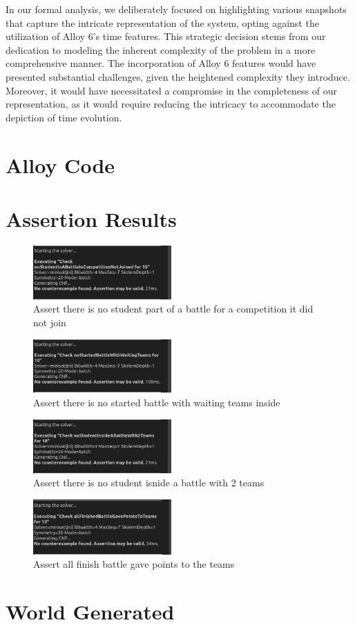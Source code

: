 In our formal analysis, we deliberately focused on highlighting various snapshots that capture the intricate representation of the system, opting against the utilization of Alloy 6's time features. This strategic decision stems from our dedication to modeling the inherent complexity of the problem in a more comprehensive manner. The incorporation of Alloy 6 features would have presented substantial challenges, given the heightened complexity they introduce. Moreover, it would have necessitated a compromise in the completeness of our representation, as it would require reducing the intricacy to accommodate the depiction of time evolution.

\section{Alloy Code}


\section{Assertion Results}

\begin{figure}[H]
    \centering
    \includegraphics[width=200px]{Images/alloy/assert_1.png}
    \caption{Assert there is no student part of a battle for a competition it did not join}
\end{figure}

\begin{figure}[H]
    \centering
    \includegraphics[width=200px]{Images/alloy/assert_2.png}
    \caption{Assert there is no started battle with waiting teams inside}
\end{figure}

\begin{figure}[H]
    \centering
    \includegraphics[width=200px]{Images/alloy/assert_3.png}
    \caption{Assert there is no student isnide a battle with 2 teams}
\end{figure}


\begin{figure}[H]
    \centering
    \includegraphics[width=200px]{Images/alloy/assert_4.png}
    \caption{Assert all finish battle gave points to the teams}
\end{figure}

\section{World Generated}
